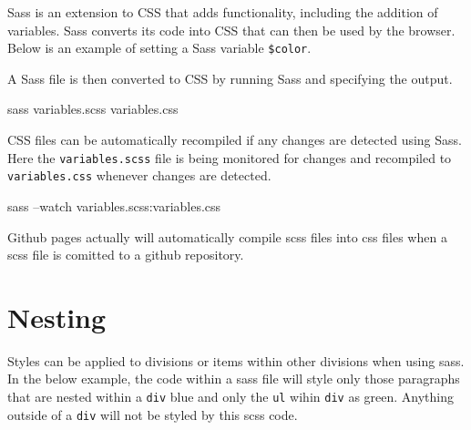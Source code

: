 \documentclass[]{book}
\newenvironment{Shaded}{\begin{snugshade}}{\end{snugshade}}
\newcommand{\KeywordTok}[1]{\textcolor[rgb]{0.13,0.29,0.53}{\textbf{#1}}}
\newcommand{\VariableTok}[1]{\textcolor[rgb]{0.00,0.00,0.00}{#1}}
\newcommand{\ExtensionTok}[1]{#1}
\newcommand{\NormalTok}[1]{#1}
\begin{document}
Sass is an extension to CSS that adds functionality, including the
addition of variables. Sass converts its code into CSS that can then be
used by the browser. Below is an example of setting a Sass variable
\texttt{\$color}.

\begin{Shaded}
\end{Shaded}

A Sass file is then converted to CSS by running Sass and specifying the
output.

\begin{Shaded}
\begin{Highlighting}[]
\ExtensionTok{sass}\NormalTok{ variables.scss variables.css}
\end{Highlighting}
\end{Shaded}

CSS files can be automatically recompiled if any changes are detected
using Sass. Here the \texttt{variables.scss} file is being monitored for
changes and recompiled to \texttt{variables.css} whenever changes are
detected.

\begin{Shaded}
\begin{Highlighting}[]
\ExtensionTok{sass}\NormalTok{ --watch variables.scss:variables.css}
\end{Highlighting}
\end{Shaded}

Github pages actually will automatically compile scss files into css
files when a scss file is comitted to a github repository.

\section{Nesting}\label{nesting}

Styles can be applied to divisions or items within other divisions when
using sass. In the below example, the code within a sass file will style
only those paragraphs that are nested within a \texttt{div} blue and
only the \texttt{ul} wihin \texttt{div} as green. Anything outside of a
\texttt{div} will not be styled by this scss code.
\end{document}
